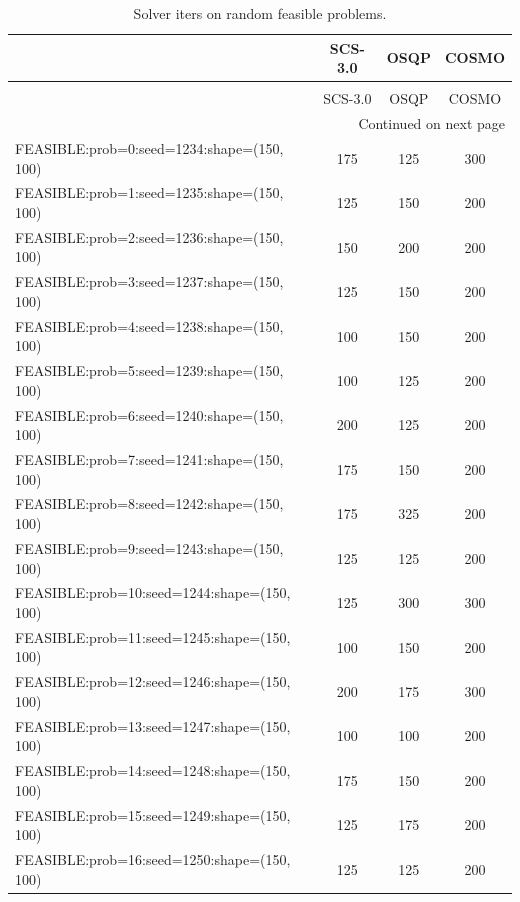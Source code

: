 \begin{longtable}{lccc}
\caption{Solver iters on random feasible problems.}
\label{t-random feasible-iters}\\
\toprule
{} &  SCS-3.0 &  OSQP &  COSMO \\
\midrule
\endfirsthead
\caption[]{Solver iters on random feasible problems.} \\
\toprule
{} &  SCS-3.0 &  OSQP &  COSMO \\
\midrule
\endhead
\midrule
\multicolumn{4}{r}{{Continued on next page}} \\
\midrule
\endfoot

\bottomrule
\endlastfoot
FEASIBLE:prob=0:seed=1234:shape=(150, 100)   &      175 &   125 &    300 \\
FEASIBLE:prob=1:seed=1235:shape=(150, 100)   &      125 &   150 &    200 \\
FEASIBLE:prob=2:seed=1236:shape=(150, 100)   &      150 &   200 &    200 \\
FEASIBLE:prob=3:seed=1237:shape=(150, 100)   &      125 &   150 &    200 \\
FEASIBLE:prob=4:seed=1238:shape=(150, 100)   &      100 &   150 &    200 \\
FEASIBLE:prob=5:seed=1239:shape=(150, 100)   &      100 &   125 &    200 \\
FEASIBLE:prob=6:seed=1240:shape=(150, 100)   &      200 &   125 &    200 \\
FEASIBLE:prob=7:seed=1241:shape=(150, 100)   &      175 &   150 &    200 \\
FEASIBLE:prob=8:seed=1242:shape=(150, 100)   &      175 &   325 &    200 \\
FEASIBLE:prob=9:seed=1243:shape=(150, 100)   &      125 &   125 &    200 \\
FEASIBLE:prob=10:seed=1244:shape=(150, 100)  &      125 &   300 &    300 \\
FEASIBLE:prob=11:seed=1245:shape=(150, 100)  &      100 &   150 &    200 \\
FEASIBLE:prob=12:seed=1246:shape=(150, 100)  &      200 &   175 &    300 \\
FEASIBLE:prob=13:seed=1247:shape=(150, 100)  &      100 &   100 &    200 \\
FEASIBLE:prob=14:seed=1248:shape=(150, 100)  &      175 &   150 &    200 \\
FEASIBLE:prob=15:seed=1249:shape=(150, 100)  &      125 &   175 &    200 \\
FEASIBLE:prob=16:seed=1250:shape=(150, 100)  &      125 &   125 &    200 \\

\end{longtable}
